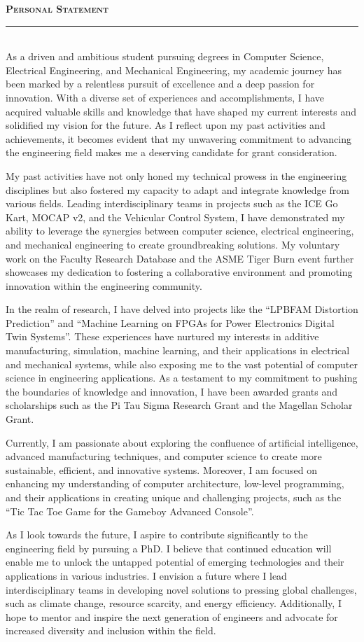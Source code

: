 \documentclass[12pt]{article}
\begin{document}
{\color{garnet}\large\textbf{\textsc{Personal Statement}}}\\[-0.8em]
{\color{garnet}\rule{\textwidth}{0.5pt}}\\[0.2em]
As a driven and ambitious student pursuing degrees in Computer Science, Electrical Engineering, and Mechanical Engineering, my academic journey has been marked by a relentless pursuit of excellence and a deep passion for innovation. With a diverse set of experiences and accomplishments, I have acquired valuable skills and knowledge that have shaped my current interests and solidified my vision for the future. As I reflect upon my past activities and achievements, it becomes evident that my unwavering commitment to advancing the engineering field makes me a deserving candidate for grant consideration.

My past activities have not only honed my technical prowess in the engineering disciplines but also fostered my capacity to adapt and integrate knowledge from various fields. Leading interdisciplinary teams in projects such as the ICE Go Kart, MOCAP v2, and the Vehicular Control System, I have demonstrated my ability to leverage the synergies between computer science, electrical engineering, and mechanical engineering to create groundbreaking solutions. My voluntary work on the Faculty Research Database and the ASME Tiger Burn event further showcases my dedication to fostering a collaborative environment and promoting innovation within the engineering community.

In the realm of research, I have delved into projects like the ``LPBFAM Distortion Prediction'' and ``Machine Learning on FPGAs for Power Electronics Digital Twin Systems''. These experiences have nurtured my interests in additive manufacturing, simulation, machine learning, and their applications in electrical and mechanical systems, while also exposing me to the vast potential of computer science in engineering applications. As a testament to my commitment to pushing the boundaries of knowledge and innovation, I have been awarded grants and scholarships such as the Pi Tau Sigma Research Grant and the Magellan Scholar Grant.

Currently, I am passionate about exploring the confluence of artificial intelligence, advanced manufacturing techniques, and computer science to create more sustainable, efficient, and innovative systems. Moreover, I am focused on enhancing my understanding of computer architecture, low-level programming, and their applications in creating unique and challenging projects, such as the ``Tic Tac Toe Game for the Gameboy Advanced Console''.

As I look towards the future, I aspire to contribute significantly to the engineering field by pursuing a PhD. I believe that continued education will enable me to unlock the untapped potential of emerging technologies and their applications in various industries. I envision a future where I lead interdisciplinary teams in developing novel solutions to pressing global challenges, such as climate change, resource scarcity, and energy efficiency. Additionally, I hope to mentor and inspire the next generation of engineers and advocate for increased diversity and inclusion within the field.
\end{document}
